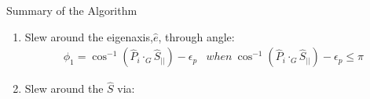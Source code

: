 \documentclass{beamer}
\begin{document}
\begin{frame}{Summary of the Algorithm}
\begin{block}{}
\begin{enumerate}
\item Slew around the eigenaxis,$\hat{e}$, through angle:
\begin{equation}
	\begin{array}{lr}
	\phi_1 = \cos^{-1}(\hat{P}_i\cdot_G\hat{S}_{||})-\epsilon_p & {\scriptstyle when}\  \cos^{-1}(\hat{P}_i\cdot_G\hat{S}_{||})-\epsilon_p\leq \pi
	\end{array}
\end{equation}
\item Slew around the $\hat{S}$ via:


\end{enumerate}
\end{block}
\end{frame}
\end{document}
